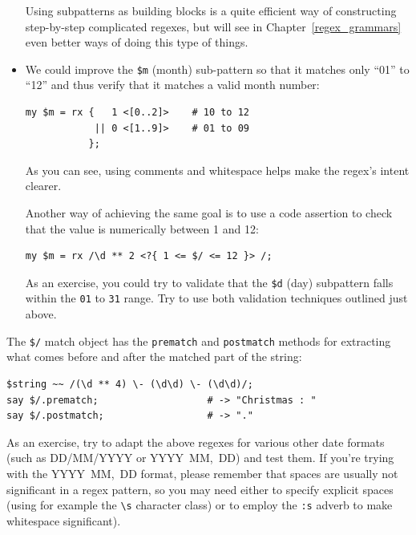 \begin{itemize}
Using subpatterns as building blocks is a quite efficient 
way of constructing step-by-step complicated regexes, but 
will see in Chapter~\ref{regex_grammars} even better ways 
of doing this type of things.

\item We could improve the \verb'$m' (month) sub-pattern so 
that it matches only ``01'' to ``12'' and thus 
verify that it matches a valid month number:

\begin{verbatim}
my $m = rx {   1 <[0..2]>    # 10 to 12
            || 0 <[1..9]>    # 01 to 09
           };
\end{verbatim}
%

As you can see, using comments and whitespace helps 
make the regex's intent clearer.

Another way of achieving the same goal is to use a 
code assertion to check that the value is numerically 
between 1 and 12:

\begin{verbatim}
my $m = rx /\d ** 2 <?{ 1 <= $/ <= 12 }> /;
\end{verbatim}

As an exercise, you could try to validate that the \verb'$d' 
(day) subpattern falls within the \verb'01' to \verb'31' 
range. Try to use both validation techniques outlined just 
above.

\end{itemize}

The \verb'$/' match object has the {\tt prematch} and 
{\tt postmatch} methods for extracting what comes before 
and after the matched part of the string:

\begin{verbatim}
$string ~~ /(\d ** 4) \- (\d\d) \- (\d\d)/;
say $/.prematch;                   # -> "Christmas : "
say $/.postmatch;                  # -> "."
\end{verbatim}
%

As an exercise, try to adapt the above regexes for various 
other date formats (such as DD/MM/YYYY or 
YYYY~MM,~DD) and test them. If you're trying with 
the YYYY~MM,~DD format, please remember that spaces are 
usually not significant in a regex pattern, so you may need 
either to specify explicit spaces (using for example the \verb'\s' 
character class) or to employ the \verb':s' adverb to make 
whitespace significant). 

